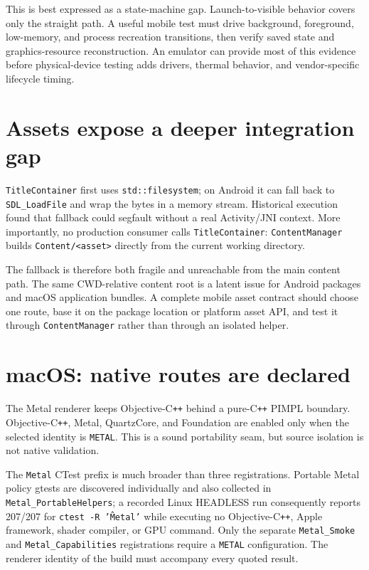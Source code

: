 This is best expressed as a state-machine gap.  Launch-to-visible behavior covers only the
straight path.  A useful mobile test must drive background, foreground, low-memory, and process
recreation transitions, then verify saved state and graphics-resource reconstruction.  An
emulator can provide most of this evidence before physical-device testing adds drivers, thermal
behavior, and vendor-specific lifecycle timing.

\section{Assets expose a deeper integration gap}

\texttt{TitleContainer} first uses \texttt{std::filesystem}; on Android it can fall back to
\texttt{SDL\_LoadFile} and wrap the bytes in a memory stream.  Historical execution found that
fallback could segfault without a real Activity/JNI context.  More importantly, no production
consumer calls \texttt{TitleContainer}: \texttt{ContentManager} builds
\texttt{Content/<asset>} directly from the current working directory.

The fallback is therefore both fragile and unreachable from the main content path.  The same
CWD-relative content root is a latent issue for Android packages and macOS application bundles.
A complete mobile asset contract should choose one route, base it on the package location or
platform asset API, and test it through \texttt{ContentManager} rather than through an isolated
helper.

\section{macOS: native routes are declared}

The Metal renderer keeps Objective-C\texttt{++} behind a pure-C\texttt{++} PIMPL boundary.
Objective-C\texttt{++}, Metal, QuartzCore, and Foundation are
enabled only when the selected identity is \texttt{METAL}.  This is a sound portability seam,
but source isolation is not native validation.

The \texttt{Metal} CTest prefix is much broader than three registrations. Portable Metal policy
gtests are discovered individually and also collected in \texttt{Metal\_PortableHelpers}; a
recorded Linux HEADLESS run consequently reports 207/207 for \texttt{ctest -R '\^Metal'} while
executing no Objective-C\texttt{++}, Apple framework, shader compiler, or GPU command. Only the
separate \texttt{Metal\_Smoke} and \texttt{Metal\_Capabilities} registrations require a
\texttt{METAL} configuration. The renderer identity of the build must accompany every quoted
result.

